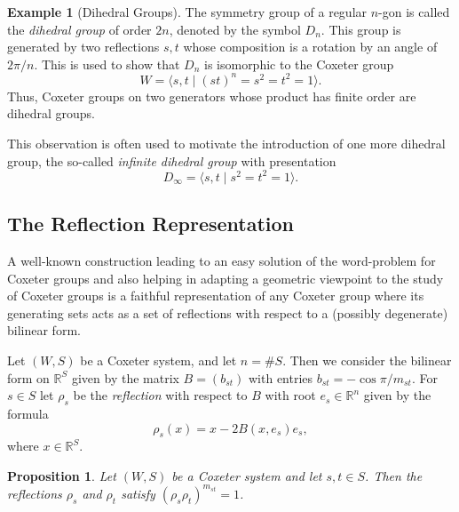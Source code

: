 \documentclass{article}
\newtheorem{proposition}[theorem]{Proposition}
\theoremstyle{definition}
\newtheorem{example}[theorem]{Example}
\begin{document}
\begin{example}[Dihedral Groups]
The symmetry group of a regular $n$-gon is called the \textit{dihedral group} of order $2n$, denoted by the symbol $D_n$. This group is generated by two reflections $s, t$ whose composition is a rotation by an angle of~$2\pi/n$. This is used to show that $D_n$ is isomorphic to the Coxeter group
$$W = \langle s, t \; | \; (st)^n = s^2 = t^2 = 1 \rangle.$$
Thus, Coxeter groups on two generators whose product has finite order are dihedral groups.

This observation is often used to motivate the introduction of one more dihedral group, the so-called \textit{infinite dihedral group} with presentation
$$D_\infty = \langle s, t \; | \; s^2 = t^2 = 1 \rangle.$$
\end{example}
\subsection{The Reflection Representation}
A well-known construction leading to an easy solution of the word-problem for Coxeter groups and also helping in adapting a geometric viewpoint to the study of Coxeter groups is a faithful representation of any Coxeter group where its generating sets acts as a set of reflections with respect to a (possibly degenerate) bilinear form.

Let $(W,S)$ be a Coxeter system, and let $n = \#S$. Then we consider the bilinear form on $\mathbb{R}^S$ given by the matrix $B = (b_{st})$ with entries $b_{st} = -\cos \pi/m_{st}$. 
For $s \in S$ let $\rho_s$ be the \textit{reflection} with respect to $B$ with root $e_s \in \mathbb{R}^n$ given by the formula
$$ \rho_s(x) = x - 2B(x, e_s)e_s,$$
where $x \in \mathbb{R}^S$.

\begin{proposition}\label{prop:reflection-representation-well-defined}
Let $(W,S)$ be a Coxeter system and let $s, t \in S$. Then the reflections $\rho_s$ and $\rho_t$ satisfy $(\rho_s \rho_t)^{m_{st}} = 1$.
\end{proposition}
\end{document}
